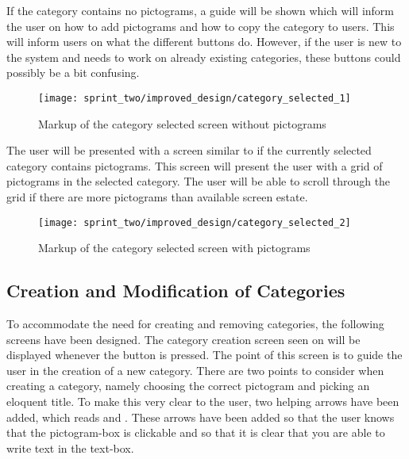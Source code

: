 If the category contains no pictograms, a guide will be shown which will inform the user on how to add pictograms and how to copy the category to users. This will inform users on what the different buttons do. However, if the user is new to the system and needs to work on already existing categories, these buttons could possibly be a bit confusing. \\

\begin{figure}[!htbp]
    \centering
    \texttt{[image: sprint\_two/improved\_design/category\_selected\_1]}
    \caption{Markup of the category selected screen without pictograms}
    \label{fig:improved_design_category_selected_1}
\end{figure}

The user will be presented with a screen similar to  if the currently selected category contains pictograms. This screen will present the user with a grid of pictograms in the selected category. The user will be able to scroll through the grid if there are more pictograms than available screen estate. 

\begin{figure}[!htbp]
    \centering
    \texttt{[image: sprint\_two/improved\_design/category\_selected\_2]}
    \caption{Markup of the category selected screen with pictograms}
    \label{fig:improved_design_category_selected_2}
\end{figure}

\subsection{Creation and Modification of Categories}
To accommodate the need for creating and removing categories, the following screens have been designed. The category creation screen seen on  will be displayed whenever the  button is pressed. The point of this screen is to guide the user in the creation of a new category. There are two points to consider when creating a category, namely choosing the correct pictogram and picking an eloquent title. To make this very clear to the user, two helping arrows have been added, which reads  and . These arrows have been added so that the user knows that the pictogram-box is clickable and so that it is clear that you are able to write text in the text-box. 


